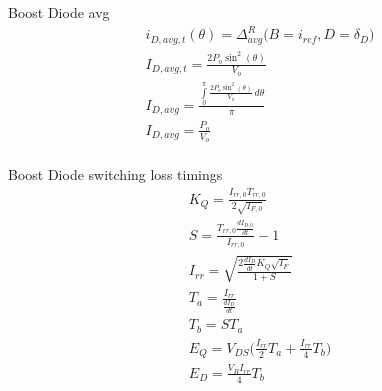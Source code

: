 \documentclass[12pt]{report}
\begin{document}
Boost Diode avg
\begin{align}
i_{D,avg,t}(\theta) = \Delta^R_{avg} \big(B=i_{ref}, D=\delta_{D} \big)\\
I_{D,avg,t} = \frac{2 P_{o} \sin^{2}{\left(\theta \right)}}{V_{o}}\\
I_{D,avg} = \frac{\int\limits_{0}^{\pi} \frac{2 P_{o} \sin^{2}{\left(\theta \right)}}{V_{o}}\, d\theta}{\pi}\\
I_{D,avg} = \frac{P_{o}}{V_{o}}\\
\end{align}

Boost Diode switching loss timings
\begin{align}
K_{Q} = \frac{I_{rr,0}T_{rr,0}}{2\sqrt{I_{F,0}}}\\
S = \frac{T_{rr,0}\frac{dI_{D,0}}{dt}}{I_{rr,0}} - 1\\
I_{rr} = \sqrt{\frac{2\frac{dI_{D}}{dt}K_{Q}\sqrt{I_{F}}}{1+S}}\\
T_{a} = \frac{I_{rr}}{\frac{dI_{D}}{dt}}\\
T_{b} = ST_{a}\\
E_{Q} = V_{DS}\big(\frac{I_{rr}}{2}T_{a}+\frac{I_{rr}}{4}T_{b}\big)\\
E_{D} = \frac{V_{R}I_{rr}}{4}T_{b}\\
\end{align}
\end{document}

